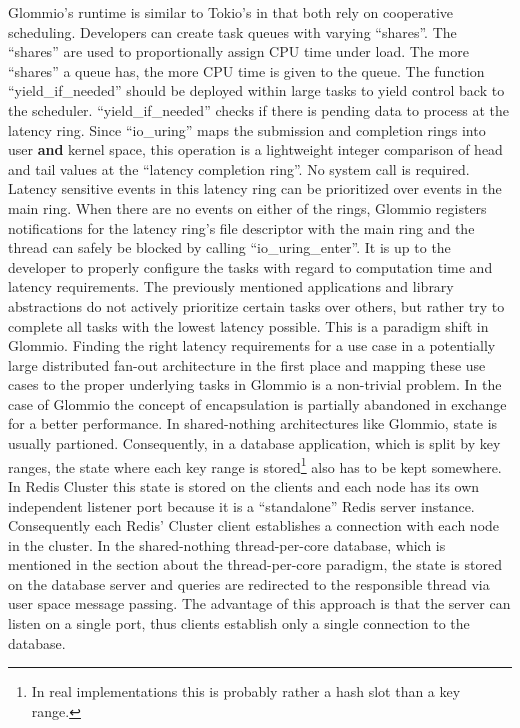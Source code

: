 Glommio’s runtime is similar to Tokio’s in that both rely on cooperative scheduling. Developers can create task queues with varying “shares”. The “shares” are used to proportionally assign CPU time under load. The more “shares” a queue has, the more CPU time is given to the queue. The function “yield\_if\_needed” should be deployed within large tasks to yield control back to the scheduler. “yield\_if\_needed” checks if there is pending data to process at the latency ring. Since “io\_uring” maps the submission and completion rings into user \textbf{and} kernel space, this operation is a lightweight integer comparison of head and tail values at the “latency completion ring”. No system call is required. Latency sensitive events in this latency ring can be prioritized over events in the main ring. When there are no events on either of the rings, Glommio registers notifications for the latency ring’s file descriptor with the main ring and the thread can safely be blocked by calling “io\_uring\_enter”. It is up to the developer to properly configure the tasks with regard to computation time and latency requirements. The previously mentioned applications and library abstractions do not actively prioritize certain tasks over others, but rather try to complete all tasks with the lowest latency possible. This is a paradigm shift in Glommio. Finding the right latency requirements for a use case in a potentially large distributed fan-out architecture in the first place and mapping these use cases to the proper underlying tasks in Glommio is a non-trivial problem. In the case of Glommio the concept of encapsulation is partially abandoned in exchange for a better performance.  \newline
In shared-nothing architectures like Glommio, state is usually partioned. Consequently, in a database application, which is split by key ranges, the state where each key range is stored\footnote{In real implementations this is probably rather a hash slot than a key range.} also has to be kept somewhere. In Redis Cluster this state is stored on the clients and each node has its own independent listener port because it is a “standalone” Redis server instance. Consequently each Redis’ Cluster client establishes a connection with each node in the cluster. In the shared-nothing thread-per-core database, which is mentioned in the section about the thread-per-core paradigm, the state is stored on the database server and queries are redirected to the responsible thread via user space message passing. The advantage of this approach is that the server can listen on a single port, thus clients establish only a single connection to the database. \newline
